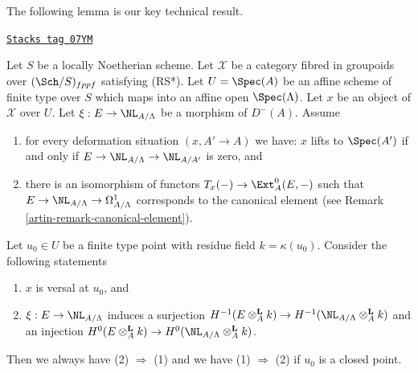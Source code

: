The following lemma is our key technical result.

\begin{lemma}
\label{artin-lemma-characterize-versal}
\href{https://stacks.math.columbia.edu/tag/07YM}{\texttt{Stacks tag 07YM}}

Let $S$ be a locally Noetherian scheme. Let $\mathcal{X}$ be a category
fibred in groupoids over $(\Sch/S)_{fppf}$ satisfying (RS*).
Let $U = \Spec(A)$ be an
affine scheme of finite type over $S$ which maps into an affine open
$\Spec(\Lambda)$. Let $x$ be an object of $\mathcal{X}$ over $U$.
Let $\xi : E \to \NL_{A/\Lambda}$ be a morphism of $D^{-}(A)$. Assume
\begin{enumerate}
\item[(i)] for every deformation situation $(x, A' \to A)$ we have:
$x$ lifts to $\Spec(A')$ if and only if
$E \to \NL_{A/\Lambda} \to \NL_{A/A'}$ is zero, and
\item[(ii)] there is an isomorphism of functors
$T_x(-) \to \Ext^0_A(E, -)$
such that $E \to \NL_{A/\Lambda} \to \Omega^1_{A/\Lambda}$
corresponds to the canonical element (see
Remark \ref{artin-remark-canonical-element}).
\end{enumerate}
Let $u_0 \in U$ be a finite type point with residue field
$k = \kappa(u_0)$. Consider the following statements
\begin{enumerate}
\item $x$ is versal at $u_0$, and
\item $\xi : E \to \NL_{A/\Lambda}$ induces a surjection
$H^{-1}(E \otimes_A^{\mathbf{L}} k) \to
H^{-1}(\NL_{A/\Lambda} \otimes_A^{\mathbf{L}} k)$
and an injection
$H^0(E \otimes_A^{\mathbf{L}} k) \to
H^0(\NL_{A/\Lambda} \otimes_A^{\mathbf{L}} k)$.
\end{enumerate}
Then we always have (2) $\Rightarrow$ (1) and we have (1) $\Rightarrow$ (2)
if $u_0$ is a closed point.
\end{lemma}

